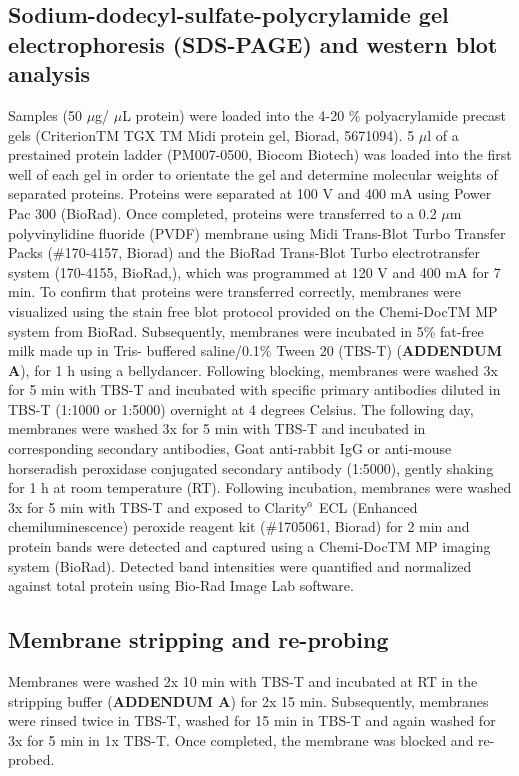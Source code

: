\subsection{Sodium-dodecyl-sulfate-polycrylamide gel electrophoresis (SDS-PAGE) and western blot analysis}
Samples (50 $\mu$g/ $\mu$L protein) were loaded into the 4-20 \% polyacrylamide precast gels (CriterionTM TGX TM Midi protein gel, Biorad, 5671094). 5 $\mu$l of a prestained protein ladder (PM007-0500, Biocom Biotech) was loaded into the first well of each gel in order to orientate the gel and determine molecular weights of separated proteins. Proteins were separated at 100 V and 400 mA using Power Pac 300 (BioRad). Once completed, proteins were transferred to a 0.2 $\mu$m polyvinylidine fluoride (PVDF) membrane using Midi Trans-Blot Turbo Transfer Packs (\#170-4157, Biorad) and the BioRad Trans-Blot Turbo electrotransfer system (170-4155, BioRad,), which was programmed at 120 V and 400 mA for 7 min. To confirm that proteins were transferred correctly, membranes were visualized using the stain free blot protocol provided on the Chemi-DocTM MP system from BioRad. Subsequently, membranes were incubated in 5\% fat-free milk made up in Tris- buffered saline/0.1\% Tween 20 (TBS-T) (\textbf{ADDENDUM A}), for 1 h using a bellydancer. Following blocking, membranes were washed 3x for 5 min with TBS-T and incubated with specific primary antibodies diluted in TBS-T (1:1000 or 1:5000) overnight at 4 degrees Celsius. The following day, membranes were washed 3x for 5 min with TBS-T and incubated in corresponding secondary antibodies, Goat anti-rabbit IgG or anti-mouse horseradish peroxidase conjugated secondary antibody (1:5000), gently shaking for 1 h at room temperature (RT). Following incubation, membranes were washed 3x for 5 min with TBS-T and exposed to Clarity${\textsuperscript{\tiny{\textregistered}}}$ ECL (Enhanced chemiluminescence) peroxide reagent kit (\#1705061, Biorad) for 2 min and protein bands were detected and captured using a Chemi-DocTM MP imaging system (BioRad). Detected band intensities were quantified and normalized against total protein using Bio-Rad Image Lab software.

\subsection{Membrane stripping and re-probing}
Membranes were washed 2x 10 min with TBS-T and incubated at RT in the stripping buffer (\textbf{ADDENDUM A}) for 2x 15 min. Subsequently, membranes were rinsed twice in TBS-T, washed for 15 min in TBS-T and again washed for 3x for 5 min in 1x TBS-T. Once completed, the membrane was blocked and re-probed.

